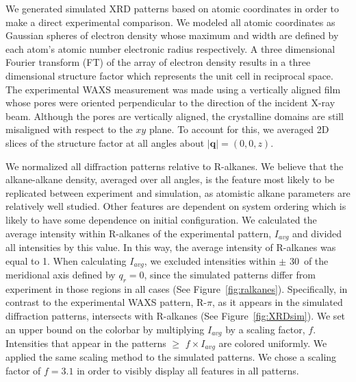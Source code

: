 \documentclass[journal=jpcbfk,manuscript=article]{achemso}
\begin{document}
  We generated simulated XRD patterns based on atomic coordinates in order to
  make a direct experimental comparison. We modeled all atomic coordinates as
  Gaussian spheres of electron density whose maximum and width are defined by
  each atom's atomic number electronic radius respectively. A three dimensional
  Fourier transform (FT) of the array of electron density results in a three
  dimensional structure factor which represents the unit cell in reciprocal
  space. The experimental WAXS measurement was made using a vertically aligned
  film whose pores were oriented perpendicular to the direction of the incident
  X-ray beam. 
  Although the pores are vertically aligned, the crystalline domains are
  still misaligned with respect to the $xy$ plane. To account for this, we averaged
  2D slices of the structure factor at all angles about $|\mathbf{q}| = (0, 0, z)$. 

  We normalized all diffraction patterns relative to R-alkanes. We believe that
  the alkane-alkane density, averaged over all angles, is the feature most likely
  to be replicated between experiment and simulation, as atomistic alkane
  parameters are relatively well studied. Other features are dependent on system
  ordering which is likely to have some dependence on initial configuration.  We
  calculated the average intensity within R-alkanes of the experimental pattern,
  $I_{avg}$ and divided all intensities by this value. In this way, the average
  intensity of R-alkanes was equal to 1. When calculating $I_{avg}$, we excluded
  intensities within $\pm$ 30\degree~of the meridional axis defined by $q_r=0$,
  since the simulated patterns differ from experiment in those regions in all
  cases (See Figure~\ref{fig:ralkanes}). Specifically, in contrast to the
  experimental WAXS pattern, R-$\pi$, as it appears in the simulated diffraction
  patterns, intersects with R-alkanes (See Figure~\ref{fig:XRDsim}). We set an
  upper bound on the colorbar by multiplying $I_{avg}$ by a scaling factor, $f$.
  Intensities that appear in the patterns $\geq$ $f\times I_{avg}$ are colored
  uniformly.  We applied the same scaling method to the simulated patterns. We
  chose a scaling factor of $f=3.1$ in order to visibly display all
  features in all patterns.

\end{document}
